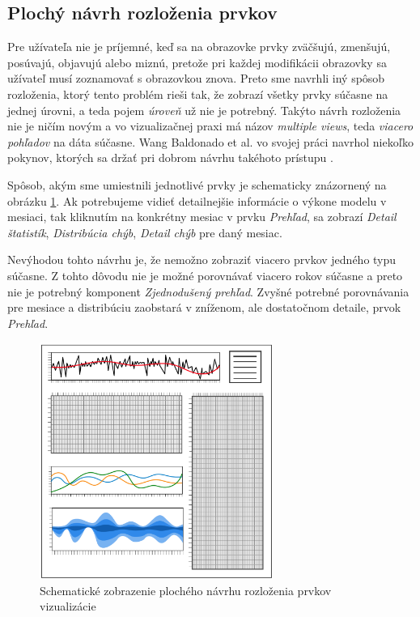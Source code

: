 \subsection{Plochý návrh rozloženia prvkov} %
Pre užívateľa nie je príjemné, keď sa na obrazovke prvky zväčšujú, zmenšujú, posúvajú, objavujú alebo miznú, pretože pri každej modifikácii obrazovky sa užívateľ musí zoznamovať s obrazovkou znova.
Preto sme navrhli iný spôsob rozloženia, ktorý tento problém rieši tak, že zobrazí všetky prvky súčasne na jednej úrovni, a teda pojem \textit{úroveň} už nie je potrebný. Takýto návrh rozloženia nie je ničím novým a vo vizualizačnej praxi má názov \textit{multiple views}, teda \textit{viacero pohľadov} na dáta súčasne. Wang Baldonado et al. vo svojej práci navrhol niekoľko pokynov, ktorých sa držať pri dobrom návrhu takéhoto prístupu \cite{Baldonado}.

Spôsob, akým sme umiestnili jednotlivé prvky je schematicky znázornený na obrázku \ref{fig:flatlayout}. Ak potrebujeme vidieť detailnejšie informácie o výkone modelu v mesiaci, tak kliknutím na konkrétny mesiac v prvku \textit{Prehľad}, sa zobrazí \textit{Detail štatistík}, \textit{Distribúcia chýb}, \textit{Detail chýb} pre daný mesiac.

Nevýhodou tohto návrhu je, že nemožno zobraziť viacero prvkov jedného typu súčasne. Z tohto dôvodu nie je možné porovnávať viacero rokov súčasne a preto nie je potrebný komponent \textit{Zjednodušený prehľad}. Zvyšné potrebné porovnávania pre mesiace a distribúciu zaobstará v zníženom, ale dostatočnom detaile, prvok \textit{Prehľad}. 


\begin{figure}
	\centering
	\includegraphics[width = 3.0in]{flatlayout}
	\caption{Schematické zobrazenie plochého návrhu rozloženia prvkov vizualizácie}
	\label{fig:flatlayout}
\end{figure}

